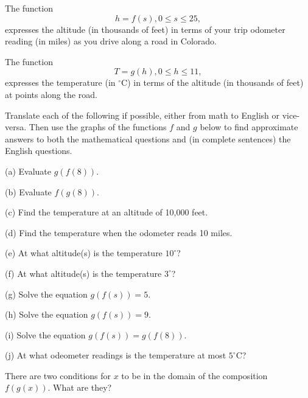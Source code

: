 \documentclass{ximera}
\begin{document}
\begin{example}  \label{Ex3:Comp}
The function
\[
     h = f(s) , 0\leq s \leq 25 ,
\]
expresses the altitude (in thousands of feet) in terms of your trip odometer reading (in miles) as you drive along a road in Colorado. 

The function 
\[
  T = g(h) , 0\leq h \leq 11 ,
\]
expresses the temperature (in $^\circ$C) in terms of the altitude (in thousands of feet) at points along the road.

Translate each of the following if possible, either from math to English or vice-versa. Then use the graphs of the functions $f$ and $g$ below to find approximate answers to both the mathematical questions and (in complete sentences) the English questions.

(a) Evaluate $g(f(8))$.

(b) Evaluate $f(g(8))$.

(c) Find the temperature at an altitude of 10,000 feet.

(d) Find the temperature when the odometer reads 10 miles.

(e) At what altitude(s) is the temperature $10^\circ$?

(f) At what altitude(s) is the temperature $3^\circ$?

(g) Solve the equation $g(f(s)) = 5$.

(h) Solve the equation $g(f(s)) = 9$.

(i) Solve the equation $g(f(s)) = g(f(8))$.

(j) At what odeometer readings is the temperature at most $5^\circ$C?



\begin{exploration}\label{Exp3:Comp}

 
\begin{onlineOnly}
    \begin{center}
\end{center}
\end{onlineOnly}
\end{exploration}

\end{example}


\begin{question}   \label{Q1:Comp}
There are two conditions for $x$ to be in the domain of the composition $f(g(x))$. What are they?
\end{question}
\end{document}
